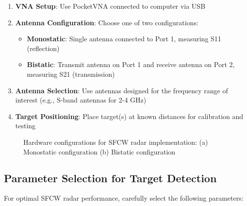 \documentclass[12pt,a4paper]{article}
\begin{document}
\begin{enumerate}
    \item \textbf{VNA Setup}: Use PocketVNA connected to computer via USB
    
    \item \textbf{Antenna Configuration}: Choose one of two configurations:
    \begin{itemize}
        \item \textbf{Monostatic}: Single antenna connected to Port 1, measuring S11 (reflection)
        \item \textbf{Bistatic}: Transmit antenna on Port 1 and receive antenna on Port 2, measuring S21 (transmission)
    \end{itemize}
    
    \item \textbf{Antenna Selection}: Use antennas designed for the frequency range of interest (e.g., S-band antennas for 2-4 GHz)
    
    \item \textbf{Target Positioning}: Place target(s) at known distances for calibration and testing
\end{enumerate}

\begin{figure}[H]
    \centering
    \caption{Hardware configurations for SFCW radar implementation: (a) Monostatic configuration (b) Bistatic configuration}
    \label{fig:radar_setup}
\end{figure}

\subsection{Parameter Selection for Target Detection}

For optimal SFCW radar performance, carefully select the following parameters:
\end{document}
